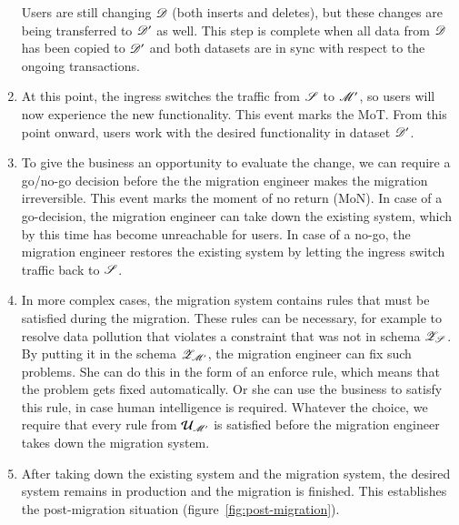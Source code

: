 \documentclass{elsarticle}
\begin{document}
\begin{enumerate}
         Users are still changing $\mathscr{D}$ (both inserts and deletes),
         but these changes are being transferred to $\mathscr{D}'$ as well.
         This step is complete when all data from $\mathscr{D}$ has been copied to $\mathscr{D}'$ and
         both datasets are in sync with respect to the ongoing transactions.
   \item At this point, the ingress switches the traffic from $\mathscr{S}$ to $\mathscr{M}'$,
         so users will now experience the new functionality.
         This event marks the MoT.
         From this point onward, users work with the desired functionality in dataset $\mathscr{D}'$.
   \item To give the business an opportunity to evaluate the change,
         we can require a go/no-go decision before the the migration engineer makes the migration irreversible.
         This event marks the moment of no return (MoN).
         In case of a go-decision, the migration engineer can take down the existing system, which by this time has become unreachable for users.
         In case of a no-go, the migration engineer restores the existing system by letting the ingress switch traffic back to $\mathscr{S}$.
   \item In more complex cases, the migration system contains rules that must be satisfied during the migration.
         These rules can be necessary, for example to resolve data pollution that violates a constraint that was not in schema $\mathscr{Z}_{\mathscr{S}}$.
         By putting it in the schema $\mathscr{Z}_{\mathscr{M}'}$,
         the migration engineer can fix such problems.
         She can do this in the form of an enforce rule, which means that the problem gets fixed automatically.
         Or she can use the business to satisfy this rule, in case human intelligence is required.
         Whatever the choice, we require that every rule from $\mathcal{U}_{\mathscr{M}'}$ is satisfied before the migration engineer takes down the migration system.
   \item After taking down the existing system and the migration system, the desired system remains in production and the migration is finished.
         This establishes the post-migration situation (figure~\ref{fig:post-migration}).
\end{enumerate}
\end{document}
